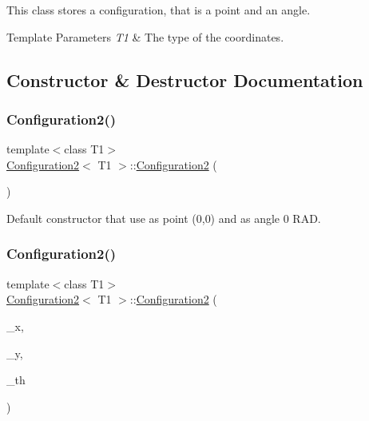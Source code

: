 This class stores a configuration, that is a point and an angle. 


\begin{DoxyTemplParams}{Template Parameters}
{\em T1} & The type of the coordinates. \\
\hline
\end{DoxyTemplParams}


\subsection{Constructor \& Destructor Documentation}
\mbox{\label{class_configuration2_a6fc5a5a723da700b6a869db09ec5614f}} 
\subsubsection{\texorpdfstring{Configuration2()}{Configuration2()}\hspace{0.1cm}{\footnotesize\ttfamily [1/4]}}
{\footnotesize\ttfamily template$<$class T1$>$ \\
\mbox{\hyperlink{class_configuration2}{Configuration2}}$<$ T1 $>$\+::\mbox{\hyperlink{class_configuration2}{Configuration2}} (\begin{DoxyParamCaption}{ }\end{DoxyParamCaption})\hspace{0.3cm}{\ttfamily [inline]}}



Default constructor that use as point (0,0) and as angle 0 R\+AD. 

\mbox{\label{class_configuration2_a09e73e9fe2ae9a67a037a0b3d0619047}} 
\subsubsection{\texorpdfstring{Configuration2()}{Configuration2()}\hspace{0.1cm}{\footnotesize\ttfamily [2/4]}}
{\footnotesize\ttfamily template$<$class T1$>$ \\
\mbox{\hyperlink{class_configuration2}{Configuration2}}$<$ T1 $>$\+::\mbox{\hyperlink{class_configuration2}{Configuration2}} (\begin{DoxyParamCaption}\item[{const T1}]{\+\_\+x,  }\item[{const T1}]{\+\_\+y,  }\item[{const \mbox{\hyperlink{class_angle}{Angle}}}]{\+\_\+th }\end{DoxyParamCaption})\hspace{0.3cm}{\ttfamily [inline]}}




